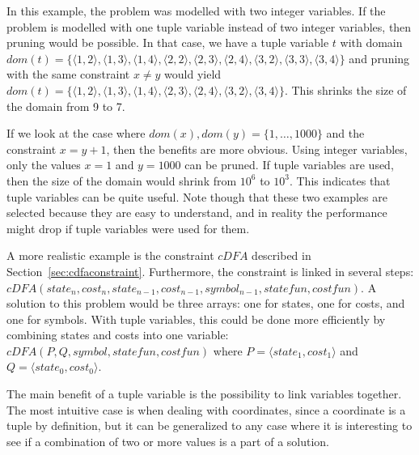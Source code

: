 \documentclass[a4paper,11pt]{article}
\begin{document}
In this example, the problem was modelled with two integer variables. If the problem is modelled with one tuple variable instead of two integer variables, then pruning would be possible. In that case, we have a tuple variable $t$ with domain 
$\mathit{dom}(t)=\{
\langle1,2\rangle,\allowbreak 
\langle1,3\rangle,\allowbreak 
\langle1,4\rangle,\allowbreak
\langle2,2\rangle,\allowbreak
\langle2,3\rangle,\allowbreak
\langle2,4\rangle,\allowbreak
\langle3,2\rangle,\allowbreak
\langle3,3\rangle,\allowbreak
\langle3,4\rangle\}$ 
and pruning with the same constraint $x\neq y$ would yield 
$\mathit{dom}(t)=\{
\langle1,2\rangle,\allowbreak
\langle1,3\rangle,\allowbreak
\langle1,4\rangle,\allowbreak
\langle2,3\rangle,\allowbreak
\langle2,4\rangle,\allowbreak
\langle3,2\rangle,\allowbreak
\langle3,4\rangle\}$. 
This shrinks the size of the domain from 9 to 7. 

If we look at the case where $\mathit{dom}(x),\mathit{dom}(y)=\{1,\ldots,1000\}$ and the constraint $x=y+1$, then the benefits are more obvious. Using integer variables, only the values $x=1$ and $y=1000$ can be pruned. If tuple variables are used, then the size of the domain would shrink from $10^6$ to $10^3$. This indicates that tuple variables can be quite useful. Note though that these two examples are selected because they are easy to understand, and in reality the performance might drop if tuple variables were used for them. 

A more realistic example is the constraint $cDFA$ described in Section~\ref{sec:cdfaconstraint}. Furthermore, the constraint is linked in several steps: 
$\mathit{cDFA}(\mathit{state_n}, \allowbreak
\mathit{cost_n},\allowbreak
\mathit{state_{n-1}},\allowbreak
\mathit{cost_{n-1}},\allowbreak
\mathit{symbol_{n-1}},\allowbreak
\mathit{statefun}, \allowbreak
\mathit{costfun})$. 
A solution to this problem would be three arrays: one for states, one for costs, and one for symbols. With tuple variables, this could be done more efficiently by combining states and costs into one variable: 
$\mathit{cDFA}(P, \allowbreak
Q, \allowbreak
\mathit{symbol}, \allowbreak
\mathit{statefun}, \allowbreak
\mathit{costfun})$ 
where 
$P=\langle 
\mathit{state_1}, \allowbreak
\mathit{cost_1} \allowbreak
\rangle$ 
and 
$Q=\langle 
\mathit{state_0}, \allowbreak
\mathit{cost_0} \allowbreak
\rangle$.

The main benefit of a tuple variable is the possibility to link variables together. The most intuitive case is when dealing with coordinates, since a coordinate is a tuple by definition, but it can be generalized to any case where it is interesting to see if a combination of two or more values is a part of a solution. 
\end{document}
